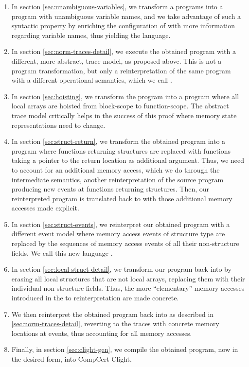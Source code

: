 \begin{enumerate}
\item In section \ref{sec:unambiguous-variables}, we transform a \cstar
  programs into a program with unambiguous variable names, and we take
  advantage of such a syntactic property by enriching the
  configuration of \cstar with more information regarding variable names,
  thus yielding the  language.
\item In section \ref{sec:norm-traces-detail}, we execute the obtained 
  program with a different, more abstract, trace model, as proposed
  above. This is not a program transformation, but only a
  reinterpretation of the same \cstar program with a different operational
  semantics, which we call .
\item In section \ref{sec:hoisting}, we transform the  program into
  a  program where all local arrays are hoisted from block-scope to
  function-scope. The abstract trace model critically helps in the
  success of this proof where memory state representations need to
  change.
\item In section \ref{sec:struct-return}, we transform the obtained
   program into a  program where functions returning structures
  are replaced with functions taking a pointer to the return location
  as additional argument. Thus, we need to account for an additional
  memory access, which we do through the  intermediate semantics,
  another reinterpretation of the source  program producing new
  events at functions returning structures. Then, our reinterpreted
   program is translated back to  with those additional memory
  accesses made explicit.
\item In section \ref{sec:struct-events}, we reinterpret our obtained
   program with a different event model where memory access events
  of structure type are replaced by the sequences of memory access
  events of all their non-structure fields. We call this new language
  .
\item In section \ref{sec:local-struct-detail}, we transform our 
  program back into  by erasing all local structures that are not
  local arrays, replacing them with their individual non-structure
  fields. Thus, the more ``elementary'' memory accesses introduced in
  the  to  reinterpretation are made concrete.
\item We then reinterpret the obtained  program back into  as
  described in \ref{sec:norm-traces-detail}, reverting to the traces
  with concrete memory locations at events, thus accounting for all
  memory accesses.
\item Finally, in section \ref{sec:clight-gen}, we compile the
  obtained  program, now in the desired form, into CompCert Clight.
\end{enumerate}

